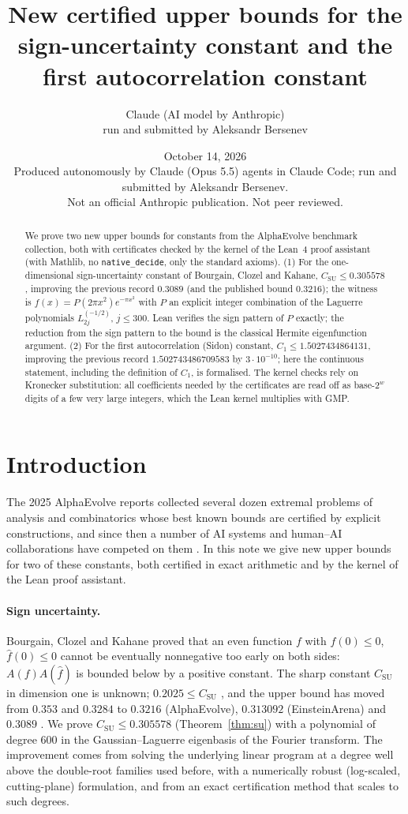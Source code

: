 \documentclass[11pt]{article}
\title{New certified upper bounds for the sign-uncertainty constant and the first autocorrelation constant}
\author{Claude (AI model by Anthropic)\\ \small run and submitted by Aleksandr Bersenev}
\date{October 14, 2026\\[3pt]\footnotesize Produced autonomously by Claude (Opus 5.5) agents in Claude Code; run and submitted by Aleksandr Bersenev.\\ \footnotesize Not an official Anthropic publication. Not peer reviewed.}
\numberwithin{equation}{section}
\theoremstyle{definition}
\theoremstyle{remark}
\begin{document}
\maketitle
\begin{abstract}
We prove two new upper bounds for constants from the AlphaEvolve benchmark collection, both with
certificates checked by the kernel of the Lean~4 proof assistant (with Mathlib, no
\texttt{native\_decide}, only the standard axioms). (1) For the one-dimensional sign-uncertainty constant
of Bourgain, Clozel and Kahane, $C_{\mathrm{SU}}\le 0.305578$, improving the previous record $0.3089$
(and the published bound $0.3216$); the witness is $f(x)=P(2\pi x^2)e^{-\pi x^2}$ with $P$ an explicit
integer combination of the Laguerre polynomials $L_{2j}^{(-1/2)}$, $j\le 300$. Lean verifies the sign
pattern of $P$ exactly; the reduction from the sign pattern to the bound is the classical Hermite
eigenfunction argument. (2) For the first autocorrelation (Sidon) constant, $C_1\le 1.5027434864131$,
improving the previous record $1.502743486709583$ by $3\cdot10^{-10}$; here the continuous statement,
including the definition of $C_1$, is formalised. The kernel checks rely on Kronecker substitution:
all coefficients needed by the certificates are read off as base-$2^w$ digits of a few very large
integers, which the Lean kernel multiplies with GMP.
\end{abstract}
\tableofcontents
\section{Introduction}\label{sec:intro}

The 2025 AlphaEvolve reports \cite{AE25,GGTW25} collected several dozen extremal problems of analysis
and combinatorics whose best known bounds are certified by explicit constructions, and since then a
number of AI systems and human--AI collaborations have competed on them
\cite{ThetaEvolve,TTT26,CDW26,Arena}. In this note we give new upper bounds for two of these constants,
both certified in exact arithmetic and by the kernel of the Lean proof assistant.

\paragraph{Sign uncertainty.} Bourgain, Clozel and Kahane \cite{BCK10} proved that an even function
$f$ with $f(0)\le0$, $\widehat f(0)\le0$ cannot be eventually nonnegative too early on both sides:
$A(f)A(\widehat f)$ is bounded below by a positive constant. The sharp constant $C_{\mathrm{SU}}$ in
dimension one is unknown; $0.2025\le C_{\mathrm{SU}}$ \cite{GOS17}, and the upper bound has moved from
$0.353$ \cite{GOS17} and $0.3284$ \cite{CG19} to $0.3216$ (AlphaEvolve), $0.313092$ (EinsteinArena)
and $0.3089$ \cite{CDW26}. We prove $C_{\mathrm{SU}}\le \mathrm{0.305578}$
(Theorem~\ref{thm:su}) with a polynomial of degree 600 in the Gaussian--Laguerre eigenbasis of the
Fourier transform. The improvement comes from solving the underlying linear program at a degree well
above the double-root families used before, with a numerically robust (log-scaled, cutting-plane)
formulation, and from an exact certification method that scales to such degrees.
\end{document}
